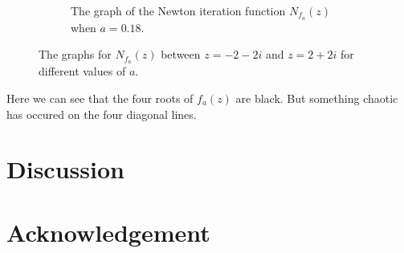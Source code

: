 \begin{figure}[h!]
\begin{subfigure}[b]{0.4\textwidth}
		\caption{The graph of the Newton iteration function $N_{f_{a}}(z)$ when $a=0.18$.}
		\label{a018}
	\end{subfigure}
	\caption{The graphs for $N_{f_{a}}(z)$ between $z=-2-2i$ and $z=2+2i$ for different values of $a$.}
	\label{results}
\end{figure}

Here we can see that the four roots of $f_a(z)$ are black. But something chaotic has occured on the four diagonal lines.

%
\newpage
\section{Discussion}
%
\section*{Acknowledgement}

